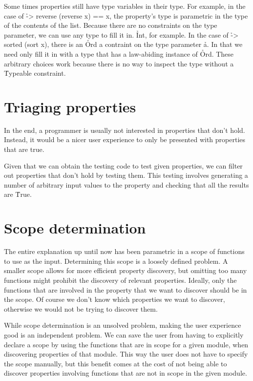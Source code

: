\documentclass[a4paper, 11pt, onepage]{article}
\begin{document}
Some times properties still have type variables in their type.
For example, in the case of \h{\x -> reverse (reverse x) == x}, the property's type is parametric in the type of the contents of the list.
Because there are no constraints on the type parameter, we can use any type to fill it in.
\h{Int}, for example.
In the case of \h{\x -> sorted (sort x)}, there is an \h{Ord a} contraint on the type parameter \h{a}.
In that we need only fill it in with a type that has a law-abiding instance of \h{Ord}.
These arbitrary choices work because there is no way to inspect the type without a \h{Typeable} constraint.

\section{Triaging properties}

In the end, a programmer is usually not interested in properties that don't hold.
Instead, it would be a nicer user experience to only be presented with properties that are true.

Given that we can obtain the testing code to test given properties, we can filter out properties that don't hold by testing them.
This testing involves generating a number of arbitrary input values to the property and checking that all the results are \h{True}.


\section{Scope determination}

The entire explanation up until now has been parametric in a scope of functions to use as the input.
Determining this scope is a loosely defined problem.
A smaller scope allows for more efficient property discovery, but omitting too many functions might prohibit the discovery of relevant properties.
Ideally, only the functions that are involved in the property that we want to discover should be in the scope.
Of course we don't know which properties we want to discover, otherwise we would not be trying to discover them.

While scope determination is an unsolved problem, making the user experience good is an independent problem.
We can save the user from having to explicitly declare a scope by using the functions that are in scope for a given module, when discovering properties of that module.
This way the user does not have to specify the scope manually, but this benefit comes at the cost of not being able to discover properties involving functions that are not in scope in the given module.
\end{document}
